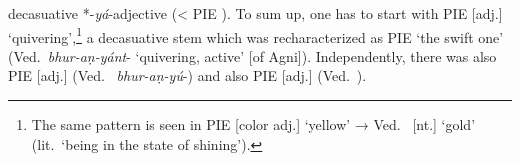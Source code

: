 \documentclass[output=paper,colorlinks,citecolor=brown]{langscibook}
\begin{document}
decasuative \mbox{*-\textit{yá}-}adjective (< PIE ). To sum up, one has to start with PIE  [adj.]  ‘quivering’,\footnote{The same pattern is seen in PIE  [color adj.] ‘yellow’ → Ved.\  [nt.] ‘gold’ (lit.\ ‘being in the state of shining’).} a decasuative stem which was recharacterized as PIE  ‘the swift one’ (Ved.\ \textit{bhur-aṇ-yánt}-  ‘quivering, active’ [of Agni]). Independently, there was also PIE  [adj.] (Ved.\  \textit{bhur-aṇ-yú}-) and also PIE  [adj.] (Ved.\ ).
\end{document}
